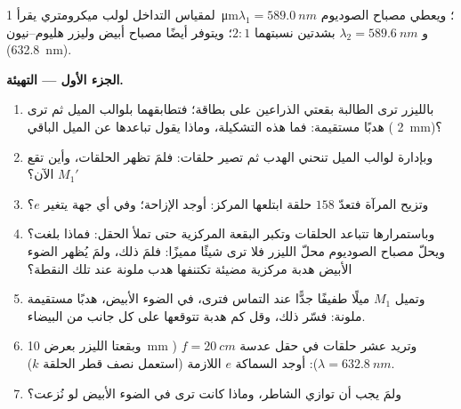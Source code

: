 \begin{problem}
\label{pb:b2:michelson:1}

لمقياس التداخل لولب ميكرومتري يقرأ \qty{1}{\micro m}؛ ويعطي
مصباح الصوديوم $\lambda_1 = \qty{589.0}{nm}$ و $\lambda_2 = \qty{589.6}{nm}$ بشدتين
نسبتهما $2 : 1$؛ ويتوفر أيضًا مصباح أبيض وليزر هليوم--نيون (\qty{632.8}{nm}).

\medskip
\noindent\textbf{الجزء الأول --- التهيئة.}
\begin{enumerate}
  \item بالليزر ترى الطالبة بقعتي الذراعين على
        بطاقة؛ فتطابقهما بلوالب الميل ثم ترى
        هدبًا مستقيمة: فما هذه التشكيلة، وماذا يقول
        تباعدها عن الميل الباقي ( \qty{2}{mm})؟
  \item وبإدارة لوالب الميل تنحني الهدب ثم تصير
        حلقات: فلمَ تظهر الحلقات، وأين تقع $M_1'$ الآن؟
  \item وتزيح المرآة فتعدّ $158$ حلقة ابتلعها
        المركز: أوجد الإزاحة؛ وفي أي جهة يتغير $e$؟
  \item وباستمرارها تتباعد الحلقات وتكبر البقعة المركزية
        حتى تملأ الحقل: فماذا بلغت؟ ويحلّ مصباح الصوديوم
        محلّ الليزر فلا ترى شيئًا مميزًا: فلمَ ذلك،
        ولمَ يُظهر الضوء الأبيض هدبة مركزية مضيئة تكتنفها
        هدب ملونة عند تلك النقطة؟
  \item وتميل $M_1$ ميلًا طفيفًا جدًّا عند التماس فترى، في الضوء
        الأبيض، هدبًا مستقيمة ملونة: فسّر ذلك، وقل كم هدبة
        تتوقعها على كل جانب من البيضاء.
  \item وبقعتا الليزر بعرض \qty{10}{mm} وتريد عشر حلقات
        في حقل عدسة $f = \qty{20}{cm}$ ($\lambda = \qty{632.8}{nm}$):
        أوجد السماكة $e$ اللازمة (استعمل نصف قطر الحلقة $k$).
  \item ولمَ يجب أن توازي  الشاطر،
        وماذا كانت ترى في الضوء الأبيض لو نُزعت؟
\end{enumerate}


\end{problem}
